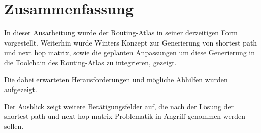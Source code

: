 \section{Zusammenfassung}\label{sec:schluss}

In dieser Ausarbeitung wurde der Routing-Atlas in seiner derzeitigen Form vorgestellt.
Weiterhin wurde Winters Konzept zur Generierung von shortest path und next hop matrix, sowie die geplanten Anpassungen um diese Generierung in die Toolchain des Routing-Atlas zu integrieren, gezeigt.

Die dabei erwarteten Herausforderungen und mögliche Abhilfen wurden aufgezeigt.

Der Ausblick zeigt weitere Betätigungsfelder auf, die nach der Lösung der shortest path und next hop matrix Problematik in Angriff genommen werden sollen.
\newpage

